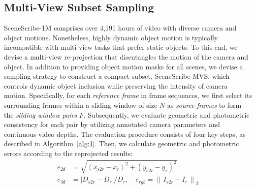 \subsection{Multi-View Subset Sampling}
\label{sec:s4}
SceneScribe-1M comprises over 4,191 hours of video with diverse camera and object motions. Nonetheless, highly dynamic object motion is typically incompatible with multi-view tasks that prefer static objects.
To this end, we devise a multi-view re-projection that disentangles the motion of the camera and object. 
In addition to providing object motion masks for all scenes, we devise a sampling strategy to construct a compact subset, SceneScribe-MVS, which controls dynamic object inclusion while preserving the intensity of camera motion. 
Specifically, for each \textit{reference frame} in frame sequences,  we first select its surrounding frames within a sliding window of size $N$ as \textit{source frames} to form the \textit{sliding window pairs} $F$. 
Subsequently, we evaluate geometric and photometric consistency for each pair by utilizing annotated camera parameters and continuous video depths.
The evaluation procedure consists of four key steps, as described in Algorithm~\ref{alg:1}. 
Then, we calculate geometric and photometric errors according to the reprojected results:
\begin{align}
e_{2d} &= \sqrt{(x_{s2r} - x_r)^2 + (y_{s2r} - y_r)^2} \\
e_{3d} &= \left| D_{s2r} - D_r\right| / D_r, \quad e_{rgb} = \left\|\, I_{s2r} -  I_{r} \, \right\|_2 
\end{align}












